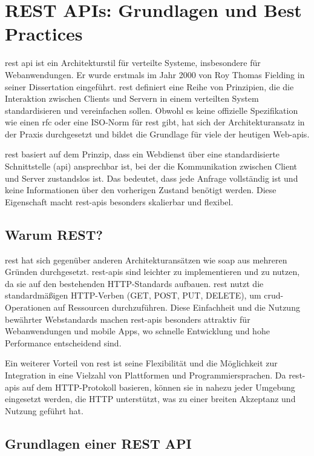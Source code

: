 
\section{REST APIs: Grundlagen und Best Practices}
\ac{rest} \ac{api} ist ein Architekturstil für verteilte Systeme, insbesondere für Webanwendungen. Er wurde erstmals im Jahr 2000 von Roy Thomas Fielding in seiner Dissertation eingeführt. \ac{rest} definiert eine Reihe von Prinzipien, die die Interaktion zwischen Clients und Servern in einem verteilten System standardisieren und vereinfachen sollen. Obwohl es keine offizielle Spezifikation wie einen \ac{rfc} oder eine ISO-Norm für \ac{rest} gibt, hat sich der Architekturansatz in der Praxis durchgesetzt und bildet die Grundlage für viele der heutigen Web-\acp{api}.

\ac{rest} basiert auf dem Prinzip, dass ein Webdienst über eine standardisierte Schnittstelle (\ac{api}) ansprechbar ist, bei der die Kommunikation zwischen Client und Server zustandslos ist. Das bedeutet, dass jede Anfrage vollständig ist und keine Informationen über den vorherigen Zustand benötigt werden. Diese Eigenschaft macht \ac{rest}-\acp{api} besonders skalierbar und flexibel.

\subsection{Warum REST?}

\ac{rest} hat sich gegenüber anderen Architekturansätzen wie \ac{soap} aus mehreren Gründen durchgesetzt. \ac{rest}-\acp{api} sind leichter zu implementieren und zu nutzen, da sie auf den bestehenden HTTP-Standards aufbauen. \ac{rest} nutzt die standardmäßigen HTTP-Verben (GET, POST, PUT, DELETE), um \ac{crud}-Operationen auf Ressourcen durchzuführen. Diese Einfachheit und die Nutzung bewährter Webstandards machen \ac{rest}-\acp{api} besonders attraktiv für Webanwendungen und mobile Apps, wo schnelle Entwicklung und hohe Performance entscheidend sind.

Ein weiterer Vorteil von \ac{rest} ist seine Flexibilität und die Möglichkeit zur Integration in eine Vielzahl von Plattformen und Programmiersprachen. Da \ac{rest}-\acp{api} auf dem HTTP-Protokoll basieren, können sie in nahezu jeder Umgebung eingesetzt werden, die HTTP unterstützt, was zu einer breiten Akzeptanz und Nutzung geführt hat.

\subsection{Grundlagen einer REST API}

